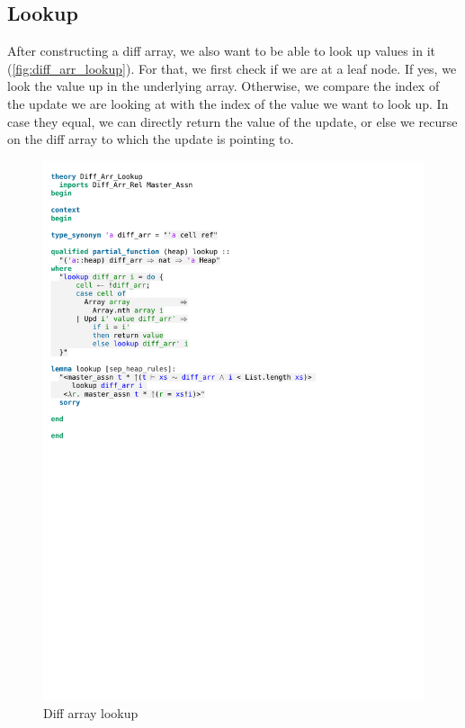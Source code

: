 \subsection{Lookup}

After constructing a diff array, we also want to be able to look up values in it (\autoref{fig:diff_arr_lookup}). For that, we first check if we are at a leaf node. If yes, we look the value up in the underlying array. Otherwise, we compare the index of the update we are looking at with the index of the value we want to look up. In case they equal, we can directly return the value of the update, or else we recurse on the diff array to which the update is pointing to.

\begin{figure}[htpb]
    \includegraphics[trim={0 19cm 0 4,8cm}, clip, width=1.00\textwidth]{figures/Theory_Diff_Arr_Lookup.pdf}
    \caption[Diff array lookup]{Diff array lookup}
    \label{fig:diff_arr_lookup}
\end{figure}

